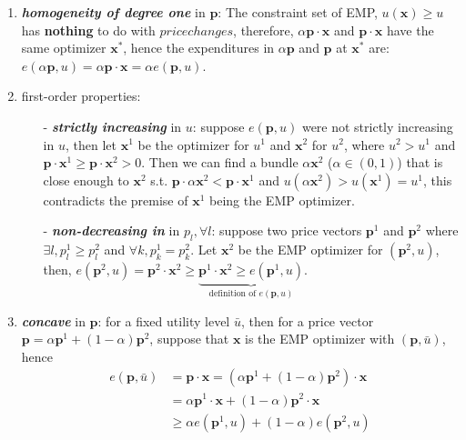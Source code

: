 \begin{enumerate}
    \item \textit{\textbf{homogeneity of degree one}} in $\mathbf{p}$: The constraint set of EMP, $u(\mathbf{x})\geq u$ has \textbf{nothing} to do with $price changes$, therefore, $\alpha\mathbf{p}\cdot \mathbf{x}$ and $\mathbf{p}\cdot \mathbf{x}$ have the same optimizer $\mathbf{x}^*$, hence the expenditures in $\alpha\mathbf{p}$ and $\mathbf{p}$ at $\mathbf{x}^*$ are: $e(\alpha\mathbf{p},u)=\alpha\mathbf{p}\cdot\mathbf{x}=\alpha e(\mathbf{p},u)$.
    \item first-order properties:
    \begin{enumerate}
        \item[-] \textit{\textbf{strictly increasing}} in $u$: suppose $e(\mathbf{p},u)$ were not strictly increasing in $u$, then let $\mathbf{x}^1$ be the optimizer for $u^1$ and $\mathbf{x}^2$ for $u^2$, where $u^2>u^1$ and $\mathbf{p}\cdot\mathbf{x}^1\geq \mathbf{p}\cdot\mathbf{x}^2>0$. Then we can find a bundle $\alpha \mathbf{x}^2$ ($\alpha \in (0,1)$) that is close enough to $\mathbf{x}^2$ s.t. $\mathbf{p}\cdot\alpha \mathbf{x}^2<\mathbf{p}\cdot \mathbf{x}^1$ and $u(\alpha\mathbf{x}^2)>u(\mathbf{x}^1)=u^1$, this contradicts the premise of $\mathbf{x}^1$ being the EMP optimizer.
        \item[-] \textit{\textbf{non-decreasing in}} in $p_l,\forall l$: suppose two price vectors $\mathbf{p}^1$ and $\mathbf{p}^2$ where $\exists l,p^1_l\geq p^2_l$ and $\forall k, p^1_k=p^2_k$. Let $\mathbf{x}^2$ be the EMP optimizer for $(\mathbf{p}^2,u)$, then, $e(\mathbf{p}^2,u)=\mathbf{p}^2\cdot \mathbf{x}^2\geq \underbrace{\mathbf{p}^1\cdot \mathbf{x}^2\geq e(\mathbf{p}^1,u)}_{\text{definition of }e(\mathbf{p},u)}$.
    \end{enumerate}
    \item \textit{\textbf{concave}} in $\mathbf{p}$: for a fixed utility level $\bar{u}$, then for a price vector $\mathbf{p}=\alpha\mathbf{p}^1+(1-\alpha)\mathbf{p}^2$, suppose that $\mathbf{x}$ is the EMP optimizer with $(\mathbf{p},\bar{u})$, hence 
    \begin{align*}
        e(\mathbf{p},\bar{u}) & = \mathbf{p}\cdot\mathbf{x} = \left(\alpha\mathbf{p}^1+(1-\alpha)\mathbf{p}^2\right)\cdot \mathbf{x}\\
        & = \alpha \mathbf{p}^1\cdot \mathbf{x} + (1-\alpha)\mathbf{p}^2\cdot \mathbf{x}\\
        & \geq \alpha e(\mathbf{p}^1,u)+(1-\alpha) e(\mathbf{p}^2,u)
    \end{align*}

\end{enumerate}
